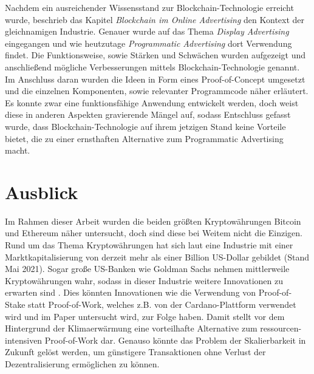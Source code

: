 Nachdem ein ausreichender Wissensstand zur Blockchain-Technologie erreicht wurde, beschrieb das Kapitel \emph{Blockchain im Online Advertising} den Kontext der gleichnamigen Industrie. Genauer wurde auf das Thema \emph{Display Advertising} eingegangen und wie heutzutage \emph{Programmatic Advertising} dort Verwendung findet. Die Funktionsweise, sowie Stärken und Schwächen wurden aufgezeigt und anschließend mögliche Verbesserungen mittels Blockchain-Technologie genannt. Im Anschluss daran wurden die Ideen in Form eines Proof-of-Concept umgesetzt und die einzelnen Komponenten, sowie relevanter Programmcode näher erläutert.\\

Es konnte zwar eine funktionsfähige Anwendung entwickelt werden, doch weist diese in anderen Aspekten gravierende Mängel auf, sodass Entschluss gefasst wurde, dass Blockchain-Technologie auf ihrem jetzigen Stand keine Vorteile bietet, die zu einer ernsthaften Alternative zum Programmatic Advertising macht.
\section{Ausblick}
Im Rahmen dieser Arbeit wurden die beiden größten Kryptowährungen Bitcoin und Ethereum näher untersucht, doch sind diese bei Weitem nicht die Einzigen. Rund um das Thema Kryptowährungen hat sich laut \cite{coinmarketcap_2021} eine Industrie mit einer Marktkapitalisierung von derzeit mehr als einer Billion US-Dollar gebildet (Stand Mai 2021). Sogar große US-Banken wie Goldman Sachs nehmen mittlerweile Kryptowährungen wahr, sodass in dieser Industrie weitere Innovationen zu erwarten sind \cite[]{handelsblatt_2021}. Dies könnten Innovationen wie die Verwendung von Proof-of-Stake statt Proof-of-Work, welches z.B. von der Cardano-Plattform verwendet wird und im Paper \cite{kiayias_2019} untersucht wird, zur Folge haben. Damit stellt vor dem Hintergrund der Klimaerwärmung eine vorteilhafte Alternative zum ressourcen-intensiven Proof-of-Work dar. Genauso könnte das Problem der Skalierbarkeit in Zukunft gelöst werden, um günstigere Transaktionen ohne Verlust der Dezentralisierung ermöglichen zu können.\\

